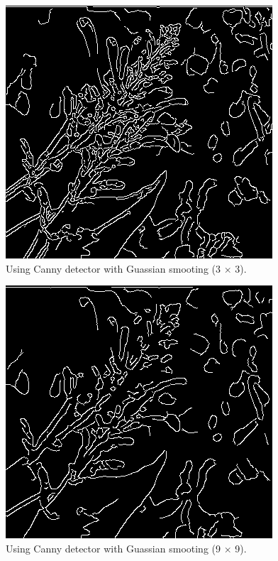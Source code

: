 \documentclass[10pt,twocolumn,letterpaper]{article}
\begin{document}
\begin{figure}[htb]
   \begin{center}
      \includegraphics[width=0.8\linewidth]{../../code/cannyTree1.png}
   \end{center}
   \caption{Using Canny detector with Guassian smooting (3 $\times$ 3).}
   \label{fig:long}
   \label{fig:onecol}
\end{figure}

\begin{figure}[htb]  
   \begin{center}
      \includegraphics[width=0.8\linewidth]{../../code/cannyTree2.png}
   \end{center}
   \caption{Using Canny detector with Guassian smooting (9 $\times$ 9).}
   \label{fig:long}
   \label{fig:onecol}
\end{figure}
\end{document}

